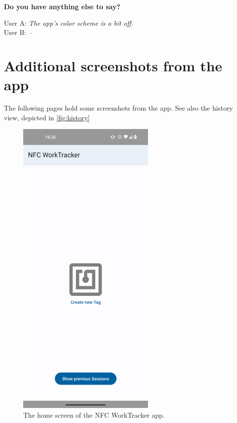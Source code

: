 \documentclass[conference]{IEEEtran}
\newcommand{\projectname}{NFC WorkTracker}
\newcommand{\surveyquestion}[3]{%
	\noindent\textbf{#1}
	
	\noindent User A: \textit{#2}\\
	User B: \textit{#3}
}
\newcommand{\phonescreenwidth}{2.69in}
\begin{document}
\surveyquestion{Do you have anything else to say?}{
	The app's color scheme is a bit off.
}{
	--
}

\newpage
\section{Additional screenshots from the app}
\label{sec:more-screenshots}

The following pages hold some screenshots from the app. See also the history view, depicted in \cref{fig:history}

\begin{figure}[h!]
	\centering
	\includegraphics[width=\phonescreenwidth]{screenshots/home.png}
	\caption{The home screen of the \projectname{} app.}
	\label{fig:home}
\end{figure}
\end{document}
